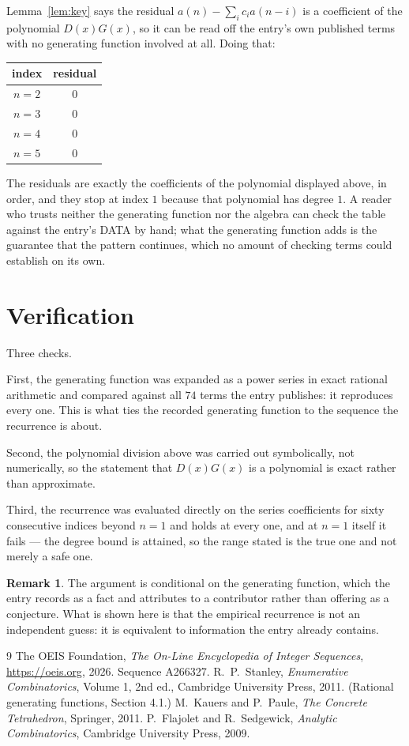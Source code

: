 \documentclass[11pt,a4paper]{article}
\theoremstyle{plain}
\theoremstyle{definition}
\newtheorem{remark}[theorem]{Remark}
\begin{document}
Lemma~\ref{lem:key} says the residual $a(n)-\sum_ic_ia(n-i)$ is a coefficient of the
polynomial $D(x)G(x)$, so it can be read off the entry's own published terms with no
generating function involved at all. Doing that:
\begin{center}
\begin{tabular}{cc}
index & residual \\ \hline
$n=2$ & $0$ \\
$n=3$ & $0$ \\
$n=4$ & $0$ \\
$n=5$ & $0$
\end{tabular}
\end{center}
The residuals are exactly the coefficients of the polynomial displayed above, in order, and
they stop at index $1$ because that polynomial has degree $1$. A reader who trusts
neither the generating function nor the algebra can check the table against the entry's DATA
by hand; what the generating function adds is the guarantee that the pattern continues, which
no amount of checking terms could establish on its own.

\section{Verification}

Three checks.

First, the generating function was expanded as a power series in exact rational arithmetic and
compared against all $74$ terms the entry publishes: it reproduces every one. This is
what ties the recorded generating function to the sequence the recurrence is about.

Second, the polynomial division above was carried out symbolically, not numerically, so the
statement that $D(x)G(x)$ is a polynomial is exact rather than approximate.

Third, the recurrence was evaluated directly on the series coefficients for sixty consecutive
indices beyond $n=1$ and holds at every one, and at $n=1$ itself it fails --- the
degree bound is attained, so the range stated is the true one and not merely a safe one.

\begin{remark}
The argument is conditional on the generating function, which the entry records as a fact and
attributes to a contributor rather than offering as a conjecture. What is shown here is that
the empirical recurrence is not an independent guess: it is equivalent to information the
entry already contains.
\end{remark}

\begin{thebibliography}{9}
 The OEIS Foundation, \emph{The On-Line Encyclopedia of Integer
Sequences}, \url{https://oeis.org}, 2026. Sequence A266327.
 R.~P.~Stanley, \emph{Enumerative Combinatorics}, Volume 1, 2nd ed.,
Cambridge University Press, 2011. (Rational generating functions, Section 4.1.)
 M.~Kauers and P.~Paule, \emph{The Concrete Tetrahedron}, Springer, 2011.
 P.~Flajolet and R.~Sedgewick, \emph{Analytic Combinatorics}, Cambridge
University Press, 2009.
\end{thebibliography}
\end{document}
